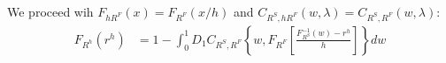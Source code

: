 \documentclass[11pt, leqno]{article}
\numberwithin{equation}{section}
\begin{document}
We proceed wih $F_{hR^F}(x)=F_{R^F}(x/h)$ and $C_{R^S,hR^F}(w, \lambda)=C_{R^S,R^F}(w, \lambda)$:
    \begin{align*}
        F_{R^h}(r^h)
        &= 1- \int^1_0 D_1 C_{R^S, R^F}
        \left\{
        w,
        F_{R^F}
        \left[
        \frac{F^{-1}_{R^S}(w)-r^h}{h}
        \right]
        \right\}dw \\
    \end{align*}
\end{document}
